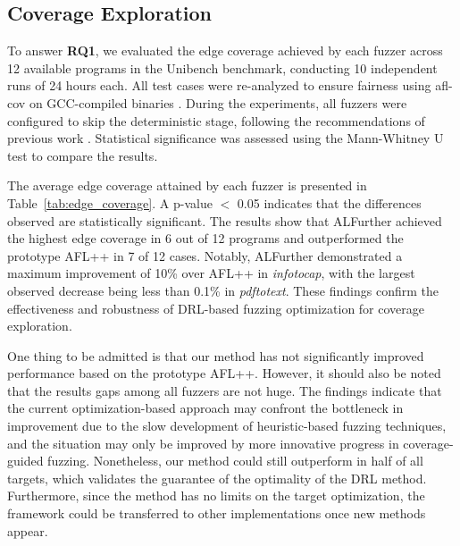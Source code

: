 \documentclass[lettersize,journal]{IEEEtran}
\begin{document}
\subsection{Coverage Exploration}\label{subsec:evaluation_coverage}


To answer \textbf{RQ1}, we evaluated the edge coverage achieved by each fuzzer across 12 available programs in the Unibench benchmark, conducting 10 independent runs of 24 hours each. All test cases were re-analyzed to ensure fairness using afl-cov on GCC-compiled binaries \cite{AFLplusplusAflcov2025}. During the experiments, all fuzzers were configured to skip the deterministic stage, following the recommendations of previous work \cite{metzmanFuzzBenchOpenFuzzer2021}. Statistical significance was assessed using the Mann-Whitney U test to compare the results.

The average edge coverage attained by each fuzzer is presented in Table~\ref{tab:edge_coverage}. A p-value $<$ 0.05 indicates that the differences observed are statistically significant. The results show that ALFurther achieved the highest edge coverage in 6 out of 12 programs and outperformed the prototype AFL++ in 7 of 12 cases. Notably, ALFurther demonstrated a maximum improvement of 10\% over AFL++ in \textit{infotocap}, with the largest observed decrease being less than 0.1\% in \textit{pdftotext}. These findings confirm the effectiveness and robustness of DRL-based fuzzing optimization for coverage exploration.

One thing to be admitted is that our method has not significantly improved performance based on the prototype AFL++. However, it should also be noted that the results gaps among all fuzzers are not huge. The findings indicate that the current optimization-based approach may confront the bottleneck in improvement due to the slow development of heuristic-based fuzzing techniques, and the situation may only be improved by more innovative progress in coverage-guided fuzzing. Nonetheless, our method could still outperform in half of all targets, which validates the guarantee of the optimality of the DRL method. Furthermore, since the method has no limits on the target optimization, the framework could be transferred to other implementations once new methods appear.
\end{document}
